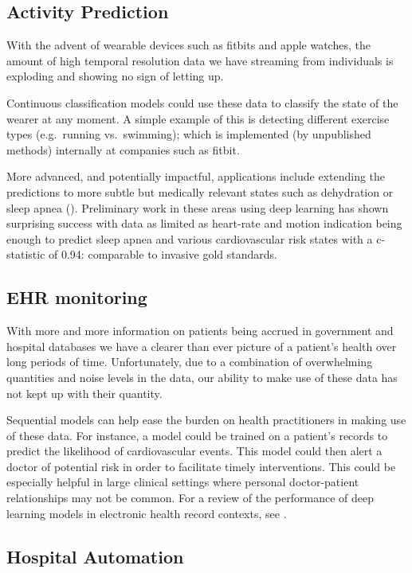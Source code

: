 \documentclass[]{book}
\theoremstyle{definition}
\theoremstyle{definition}
\theoremstyle{definition}
\theoremstyle{remark}
\begin{document}
\subsection{Activity Prediction}\label{activity-prediction}

With the advent of wearable devices such as fitbits and apple watches,
the amount of high temporal resolution data we have streaming from
individuals is exploding and showing no sign of letting up.

Continuous classification models could use these data to classify the
state of the wearer at any moment. A simple example of this is detecting
different exercise types (e.g.~running vs.~swimming); which is
implemented (by unpublished methods) internally at companies such as
fitbit.

More advanced, and potentially impactful, applications include extending
the predictions to more subtle but medically relevant states such as
dehydration or sleep apnea (\citet{wearable_atrial}). Preliminary work
in these areas using deep learning has shown surprising success with
data as limited as heart-rate and motion indication being enough to
predict sleep apnea and various cardiovascular risk states with a
c-statistic of 0.94: comparable to invasive gold standards.

\subsection{EHR monitoring}\label{ehr-monitoring}

With more and more information on patients being accrued in government
and hospital databases we have a clearer than ever picture of a
patient's health over long periods of time. Unfortunately, due to a
combination of overwhelming quantities and noise levels in the data, our
ability to make use of these data has not kept up with their quantity.

Sequential models can help ease the burden on health practitioners in
making use of these data. For instance, a model could be trained on a
patient's records to predict the likelihood of cardiovascular events.
This model could then alert a doctor of potential risk in order to
facilitate timely interventions. This could be especially helpful in
large clinical settings where personal doctor-patient relationships may
not be common. For a review of the performance of deep learning models
in electronic health record contexts, see \citet{deep_ehr}.

\subsection{Hospital Automation}\label{hospital-automation}
\end{document}
